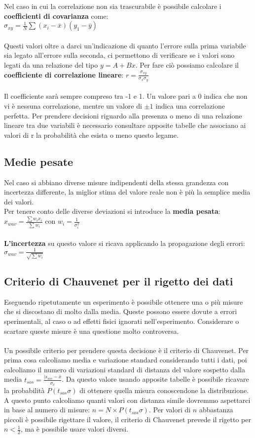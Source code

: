 \documentclass{article}
\begin{document}
Nel caso in cui la correlazione non sia trascurabile è possibile calcolare i \textbf{coefficienti di covarianza} come:\\
$\sigma_{xy} = \frac{1}{N} \sum(x_i - \bar{x})(y_1 - \bar{y})$\\\\
Questi valori oltre a darci un'indicazione di quanto l'errore sulla prima variabile sia legato all'errore sulla seconda, ci permettono di verificare se i valori sono legati da una relazione del tipo $y = A + Bx$. Per fare ciò possiamo calcolare il \textbf{coefficiente di correlazione lineare}: $r = \frac{\sigma_{xy}}{\sigma_x \sigma_y}$\\\\
Il coefficiente sarà sempre compreso tra -1 e 1. Un valore pari a 0 indica che non vi è nessuna correlazione, mentre un valore di $\pm1$ indica una correlazione perfetta. Per prendere decisioni riguardo alla presenza o meno di una relazione lineare tra due variabili è necessario consultare apposite tabelle che associano ai valori di r la probabilità che esista o meno questo legame.

\subsection{Medie pesate}
Nel caso si abbiano diverse misure indipendenti della stessa grandezza con incertezza differente, la miglior stima del valore reale non è più la semplice media dei valori.\\
Per tenere conto delle diverse deviazioni si introduce la \textbf{media pesata}: $x_{wav} = \frac{\sum w_i x_i}{\sum w_i}$ con $w_i = \frac{1}{\sigma_i ^2}$\\\\
\textbf{L'incertezza} su questo valore si ricava applicando la propagazione degli errori: $\sigma_{wav} = \frac{1}{\sqrt{\sum w_i}}$

\subsection{Criterio di Chauvenet per il rigetto dei dati}
Eseguendo ripetutamente un esperimento è possibile ottenere una o più misure che si discostano di molto dalla media. Queste possono essere dovute a errori sperimentali, al caso o ad effetti fisici ignorati nell'esperimento. Considerare o scartare queste misure è una questione molto controversa.\\\\
Un possibile criterio per prendere questa decisione è il criterio di Chauvenet. Per prima cosa calcoliamo media e variazione standard considerando tutti i dati, poi calcoliamo il numero di variazioni standard di distanza del valore sospetto dalla media $t_{sos}=\frac{|s_{sos}-\bar{x}}{\sigma_x}$. Da questo valore usando apposite tabelle è possibile ricavare la probabilità $P(t_{sos}\sigma)$ di ottenere quella misura conoscendone la distribuzione. A questo punto calcoliamo quanti valori con distanza simile dovremmo aspettarci in base al numero di misure: $n=N\times P(t_{sos}\sigma)$. Per valori di $n$ abbastanza piccoli è possibile rigettare il valore, il criterio di Chauvenet prevede il rigetto per $n<\frac{1}{2}$, ma è possibile usare valori diversi.
\end{document}
